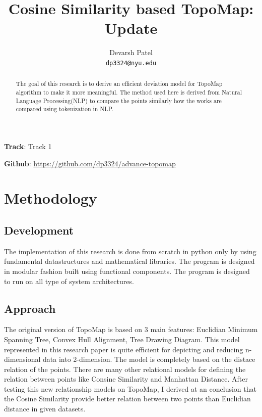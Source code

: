 \documentclass[a4paper]{article}
\title{Cosine Similarity based TopoMap: Update}
\author{Devarsh Patel \\
  \texttt{dp3324@nyu.edu}}
\affil{
  Department of Computer Science \\
  NYU Tandon School of Technnology, NY
}
\begin{document}
  \maketitle

  \begin{center}
    \textbf{Track}: Track 1
  \end{center}

  \begin{center}
    \textbf{Github}: \href{https://github.com/dp3324/advance-topomap}{https://github.com/dp3324/advance-topomap}
  \end{center}

  \begin{abstract}
    The goal of this research is to derive an efficient deviation model for TopoMap algorithm to make it more meaningful. The method used here is derived from Natural Language Processing(NLP) to compare the points similarly how the works are compared using tokenization in NLP.
  \end{abstract}

  \section{Methodology}
  \subsection{Development}
    The implementation of this research is done from scratch in python only by using fundamental datastructures and mathematical libraries. The program is designed in modular fashion built using functional components. The program is designed to run on all type of system architectures. 


  \subsection{Approach}
    The original version of TopoMap\cite{topomap} is based on 3 main features: Euclidian Minimum Spanning Tree, Convex Hull Alignment, Tree Drawing Diagram. This model represented in this research paper is quite efficient for depicting and reducing n-dimensional data into 2-dimension. The model is completely based on the distace relation of the points. There are many other relational models for defining the relation between points like Consine Similarity and Manhattan Distance. After testing this new relationship models on TopoMap\cite{topomap}, I derived at an conclusion that the Cosine Similarity provide better relation between two points than Euclidian distance in given datasets. 
    
\end{document}
